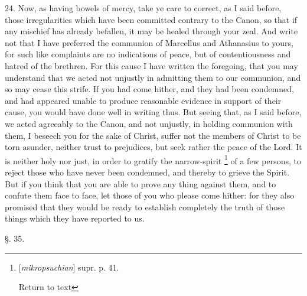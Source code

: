 24. Now, as having bowels of mercy, take ye care
to correct, as I said before, those irregularities which have been
committed contrary to the Canon, so that if any mischief has already
befallen, it may be healed through your zeal. And write not that I
have preferred the communion of Marcellus and Athanasius to yours, for
such like complaints are no indications of peace, but of
contentiousness and hatred of the brethren. For this cause I have
written the foregoing, that you may understand that we acted not
unjustly in admitting them to our communion, and so may cease this
strife. If you had come hither, and they had been condemned, and had
appeared unable to produce reasonable evidence in support of their
cause, you would have done well in writing thus. But seeing that, as I
said before, we acted agreeably to the Canon, and not unjustly, in
holding communion with them, I beseech you for the sake of Christ,
suffer not the members of Christ to be torn asunder, neither trust to
prejudices, but seek rather the peace of the Lord. It is neither holy
nor just, in order to gratify the narrow-spirit \footnote{[\emph{mikropsuchian}] supr. p. 41.

Return to text} of a few persons, to reject those who have never been
condemned, and thereby to grieve the Spirit. But if you think that you
are able to prove any thing against them, and to confute them face to
face, let those of you who please come hither: for they also promised
that they would be ready to establish completely the truth of those
things which they have reported to us.

§. 35.

